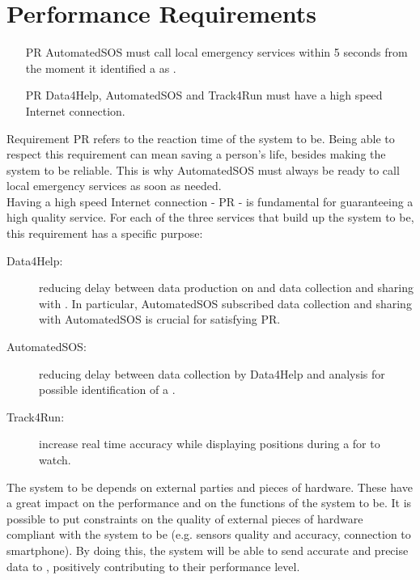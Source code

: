 \documentclass[../../rasd.tex]{subfiles}
\begin{document}
\section{Performance Requirements}
\begin{itemize}
	\item[PR\subs{1}]AutomatedSOS must call local emergency services within 5 seconds from the moment it identified a  as .
	\item[PR\subs{2}]Data4Help, AutomatedSOS and Track4Run must have a high speed Internet connection.
\end{itemize}

Requirement PR refers to the reaction time of the system to be. Being able to respect this requirement can mean saving a person's life, besides making the system to be reliable. This is why AutomatedSOS must always be ready to call local emergency services as soon as needed.\\

Having a high speed Internet connection - PR - is fundamental for guaranteeing a high quality service. For each of the three services that build up the system to be, this requirement has a specific purpose:
\begin{description}
	\item[Data4Help:] reducing delay between data production on  and data collection and sharing with . In particular, AutomatedSOS subscribed  data collection and sharing with AutomatedSOS is crucial for satisfying PR. 
	\item[AutomatedSOS:] reducing delay between data collection by Data4Help and analysis for possible identification of a .
	\item[Track4Run:] increase real time accuracy while displaying  positions during a  for  to watch.\\
\end{description}

The system to be depends on external parties and pieces of hardware. These have a great impact on the performance and on the functions of the system to be. It is possible to put constraints on the quality of external pieces of hardware compliant with the system to be (e.g. sensors quality and accuracy,  connection to smartphone). By doing this, the system will be able to send accurate and precise data to , positively contributing to their performance level.
\end{document}
